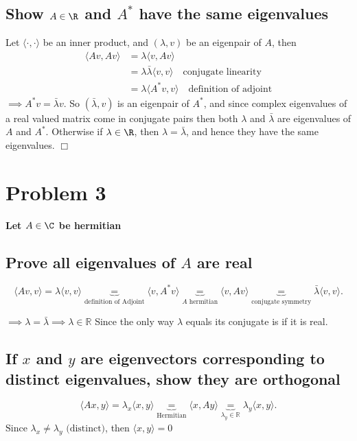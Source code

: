 \subsection{Show $A\in\R$ and $A^{*}$ have the same eigenvalues}%
\label{sub:2.3}

Let $\langle \cdot, \cdot \rangle$ be an inner
product, and $(\lambda,v)$ be an eigenpair of  $A$, then
\begin{align*}
  \langle Av,Av \rangle &= \lambda  \langle v, Av \rangle \\
  &= \lambda \bar\lambda\langle  v, v \rangle \quad
  \text{conjugate linearity} \\
  &= \lambda \langle A^{*}v, v \rangle \quad \text{definition of adjoint}
\end{align*}
$\implies A^{*}v = \bar \lambda v$. So $(\bar\lambda,v) $ is an eigenpair of
$A^{*}$, and since complex eigenvalues of a real valued matrix come in conjugate
pairs then both  $\lambda $ and $\bar \lambda $ are eigenvalues of $A$ and
$A^{*}$. Otherwise if $\lambda \in\R$, then $\lambda = \bar \lambda $, and
hence they have the same eigenvalues. $\Box$

\section{Problem 3}%
\label{sec:problem_3}

\textbf{Let $A\in\C$ be hermitian} 

\subsection{ Prove all eigenvalues of $A$ are real}%
\label{sub:3.1}

\[
\langle Av,v\rangle =\lambda\langle
v,v\rangle\underbrace{=}_{\text{definition of Adjoint}} \langle v,
A^*v\rangle \underbrace{=}_{\text{$A$ hermitian}} \langle v,Av\rangle
\underbrace{=}_{\text{conjugate symmetry}} \bar\lambda\langle v,v\rangle
.\] 

$\implies \lambda =\bar\lambda\implies\lambda\in\mathbb{R}$
Since the only way $\lambda$ equals its conjugate is if it is real.


\subsection{If $x$ and $y$ are eigenvectors corresponding to distinct
eigenvalues, show they are orthogonal}%
\label{sub:3.2}


\[
\langle Ax, y \rangle = \lambda_x\langle x, y\rangle
  \underbrace{=}_{\text{Hermitian}} \langle x,
Ay \rangle \underbrace{=}_{\text{$\lambda_y\in\mathbb{R}$}} \lambda_y \langle x,y\rangle
.\] 
$\text{Since } \lambda_x \neq\lambda_y \text{ (distinct)}$, then $\langle x, y\rangle= 0$ 

